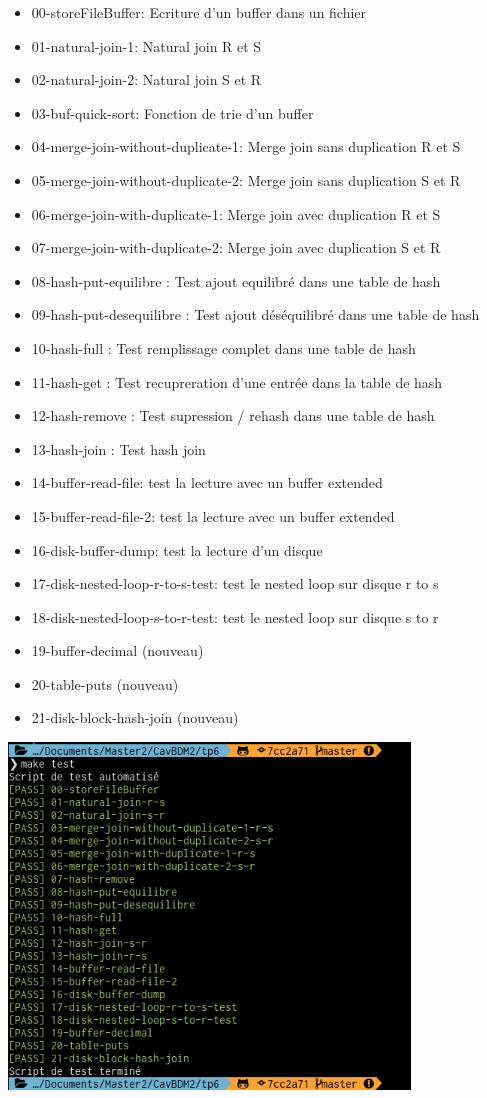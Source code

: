 \documentclass[a4paper]{article}
\begin{document}
\begin{itemize}
  \item 00-storeFileBuffer: Ecriture d'un buffer dans un fichier
  \item 01-natural-join-1: Natural join R et S
  \item 02-natural-join-2: Natural join S et R
  \item 03-buf-quick-sort: Fonction de trie d'un buffer
  \item 04-merge-join-without-duplicate-1: Merge join sans duplication R et S
  \item 05-merge-join-without-duplicate-2: Merge join sans duplication S et R
  \item 06-merge-join-with-duplicate-1: Merge join avec duplication R et S
  \item 07-merge-join-with-duplicate-2: Merge join avec duplication S et R
  \item 08-hash-put-equilibre : Test ajout equilibré dans une table de hash
  \item 09-hash-put-desequilibre : Test ajout déséquilibré dans une table de hash
  \item 10-hash-full : Test remplissage complet dans une table de hash
  \item 11-hash-get : Test recupreration d'une entrée dans la table de hash
  \item 12-hash-remove : Test supression / rehash dans une table de hash
  \item 13-hash-join : Test hash join
  \item 14-buffer-read-file: test la lecture avec un buffer extended
  \item 15-buffer-read-file-2: test la lecture avec un buffer extended
  \item 16-disk-buffer-dump: test la lecture d'un disque
  \item 17-disk-nested-loop-r-to-s-test: test le nested loop sur disque r to s
  \item 18-disk-nested-loop-s-to-r-test: test le nested loop sur disque s to r
  \item 19-buffer-decimal (nouveau)
  \item 20-table-puts (nouveau)
  \item 21-disk-block-hash-join (nouveau)
\end{itemize}

\includegraphics[width=0.8\textwidth]{test.png}
\end{document}
